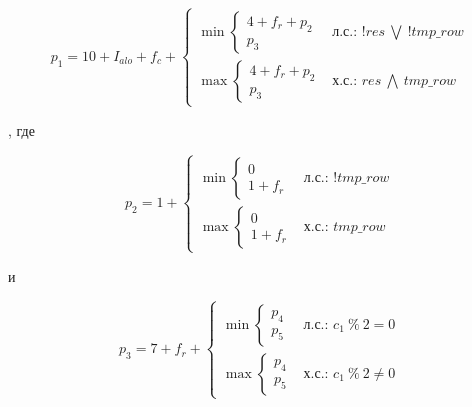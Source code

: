 \begin{enumerate}
    \begin{equation*}
        p_1 =
        10 + I_{alo} + f_c +
        \begin{cases}
            \min
            \begin{cases}
                4 + f_r + p_2 \\
                p_3
            \end{cases} & \textit{л.с.: $!res~\bigvee~!tmp\_row$} \\
            \max
            \begin{cases}
                4 + f_r + p_2 \\
                p_3
            \end{cases} & \textit{х.с.: $res~\bigwedge~tmp\_row$}
        \end{cases}
    \end{equation*}

    , где

    \begin{equation*}
        p_2 =
        1 +
        \begin{cases}
            \min
            \begin{cases}
                0 \\
                1 + f_r
            \end{cases} & \textit{л.с.: !tmp\_row} \\
            \max
            \begin{cases}
                0 \\
                1 + f_r
            \end{cases} & \textit{х.с.: tmp\_row}
        \end{cases}
    \end{equation*}

    и

    \begin{equation*}
        p_3 =
        7 + f_r +
        \begin{cases}
            \min
            \begin{cases}
                p_4 \\
                p_5
            \end{cases} & \textit{л.с.: $c_1~\%~2 = 0$} \\
            \max
            \begin{cases}
                p_4 \\
                p_5
            \end{cases} & \textit{х.с.: $c_1~\%~2 \ne 0$}
        \end{cases}
    \end{equation*}


\end{enumerate}
